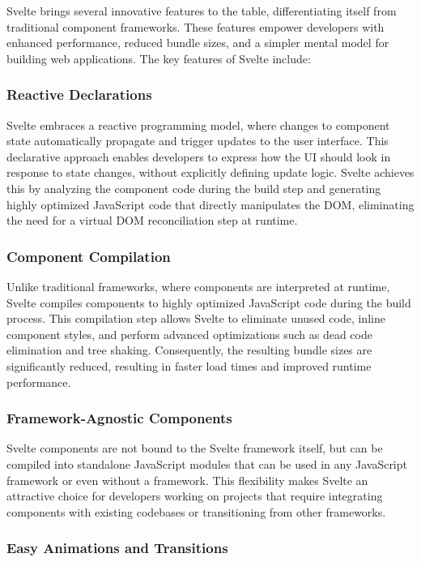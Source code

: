 Svelte brings several innovative features to the table, differentiating itself from traditional component frameworks. These features empower developers with enhanced performance, reduced bundle sizes, and a simpler mental model for building web applications. The key features of Svelte include:

\subsubsection{Reactive Declarations}

Svelte embraces a reactive programming model, where changes to component state automatically propagate and trigger updates to the user interface. This declarative approach enables developers to express how the UI should look in response to state changes, without explicitly defining update logic. Svelte achieves this by analyzing the component code during the build step and generating highly optimized JavaScript code that directly manipulates the DOM, eliminating the need for a virtual DOM reconciliation step at runtime.

\subsubsection{Component Compilation}

Unlike traditional frameworks, where components are interpreted at runtime, Svelte compiles components to highly optimized JavaScript code during the build process. This compilation step allows Svelte to eliminate unused code, inline component styles, and perform advanced optimizations such as dead code elimination and tree shaking. Consequently, the resulting bundle sizes are significantly reduced, resulting in faster load times and improved runtime performance.

\subsubsection{Framework-Agnostic Components}

Svelte components are not bound to the Svelte framework itself, but can be compiled into standalone JavaScript modules that can be used in any JavaScript framework or even without a framework. This flexibility makes Svelte an attractive choice for developers working on projects that require integrating components with existing codebases or transitioning from other frameworks.

\subsubsection{Easy Animations and Transitions}

